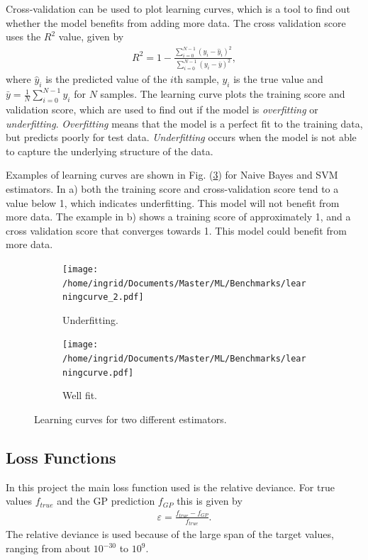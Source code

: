 \documentclass[twoside,english]{uiofysmaster}
\begin{document}
Cross-validation can be used to plot learning curves, which is a tool to find out whether the model benefits from adding more data. The cross validation score uses the $R^2$ value, given by
\begin{align}
R^2 = 1 - \frac{\sum_{i=0}^{N-1} (y_i - \hat{y}_i)^2}{\sum_{i=0}^{N-1} (y_i - \bar{y})^2},
\end{align}
where $\hat{y}_i$ is the predicted value of the $i$th sample, $y_i$ is the true value and $\bar{y} = \frac{1}{N} \sum_{i = 0}^{N-1} y_i$ for $N$ samples. The learning curve plots the training score and validation score, which are used to find out if the model is \textit{overfitting} or \textit{underfitting}. \textit{Overfitting} means that the model is a perfect fit to the training data, but predicts poorly for test data. \textit{Underfitting} occurs when the model is not able to capture the underlying structure of the data. 

Examples of learning curves are shown in Fig. (\ref{Fig:: gaussian process : learning curves}) for Naive Bayes and SVM estimators. In a) both the training score and cross-validation score tend to a value below 1, which indicates underfitting. This model will not benefit from more data. The example in b) shows a training score of approximately 1, and a cross validation score that converges towards 1. This model could benefit from more data.

\begin{figure}
    \centering
    \begin{subfigure}[b]{0.45\textwidth}
        \texttt{[image: /home/ingrid/Documents/Master/ML/Benchmarks/learningcurve\_2.pdf]}
        \caption{Underfitting.}
        \label{fig:gull}
    \end{subfigure}
    \begin{subfigure}[b]{0.45\textwidth}
        \texttt{[image: /home/ingrid/Documents/Master/ML/Benchmarks/learningcurve.pdf]}
        \caption{Well fit.}
        \label{fig:tiger}
    \end{subfigure}
\caption{Learning curves for two different estimators.}
\label{Fig:: gaussian process : learning curves}
\end{figure}



\subsection{Loss Functions}

In this project the main loss function used is the relative deviance. For true values $f_{true}$ and the GP prediction $f_{GP}$ this is given by
\begin{align}
\varepsilon = \frac{f_{true} - f_{GP}}{f_{true}}.
\end{align} 
The relative deviance is used because of the large span of the target values, ranging from about $10^{-30}$ to $10^9$.
\end{document}
